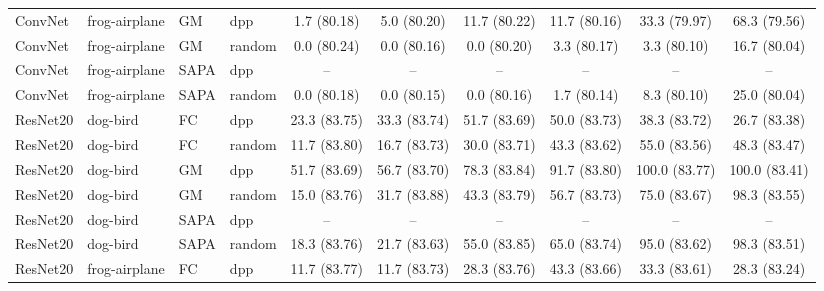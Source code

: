 \begin{table}[h]
{\begin{tabular}{llllcccccc}
ConvNet & frog-airplane & GM & dpp
& 1.7 \small{(80.18)}
& 5.0 \small{(80.20)}
& 11.7 \small{(80.22)}
& 11.7 \small{(80.16)}
& 33.3 \small{(79.97)}
& 68.3 \small{(79.56)} \\


ConvNet & frog-airplane & GM & random
& 0.0 \small{(80.24)}
& 0.0 \small{(80.16)}
& 0.0 \small{(80.20)}
& 3.3 \small{(80.17)}
& 3.3 \small{(80.10)}
& 16.7 \small{(80.04)} \\ [1em]

ConvNet & frog-airplane & SAPA & dpp
& --
& --
& --
& --
& --
& -- \\


ConvNet & frog-airplane & SAPA & random
& 0.0 \small{(80.18)}
& 0.0 \small{(80.15)}
& 0.0 \small{(80.16)}
& 1.7 \small{(80.14)}
& 8.3 \small{(80.10)}
& 25.0 \small{(80.04)} \\ [0.1em] 


\hline 


ResNet20 & dog-bird & FC & dpp
& 23.3 \small{(83.75)}
& 33.3 \small{(83.74)}
& 51.7 \small{(83.69)}
& 50.0 \small{(83.73)}
& 38.3 \small{(83.72)}
& 26.7 \small{(83.38)} \\



ResNet20 & dog-bird & FC & random
& 11.7 \small{(83.80)}
& 16.7 \small{(83.73)}
& 30.0 \small{(83.71)}
& 43.3 \small{(83.62)}
& 55.0 \small{(83.56)}
& 48.3 \small{(83.47)} \\
[1em]


ResNet20 & dog-bird & GM & dpp
& 51.7 \small{(83.69)}
& 56.7 \small{(83.70)}
& 78.3 \small{(83.84)}
& 91.7 \small{(83.80)}
& 100.0 \small{(83.77)}
& 100.0 \small{(83.41)} \\



ResNet20 & dog-bird & GM & random
& 15.0 \small{(83.76)}
& 31.7 \small{(83.88)}
& 43.3 \small{(83.79)}
& 56.7 \small{(83.73)}
& 75.0 \small{(83.67)}
& 98.3 \small{(83.55)} \\ [1em]

ResNet20 & dog-bird & SAPA & dpp
& --
& --
& --
& --
& --
& -- \\



ResNet20 & dog-bird & SAPA & random
& 18.3 \small{(83.76)}
& 21.7 \small{(83.63)}
& 55.0 \small{(83.85)}
& 65.0 \small{(83.74)}
& 95.0 \small{(83.62)}
& 98.3 \small{(83.51)} \\ [1em]



ResNet20 & frog-airplane & FC & dpp
& 11.7 \small{(83.77)}
& 11.7 \small{(83.73)}
& 28.3 \small{(83.76)}
& 43.3 \small{(83.66)}
& 33.3 \small{(83.61)}
& 28.3 \small{(83.24)} \\



\end{tabular}}
\end{table}
